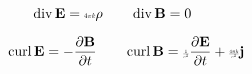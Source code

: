 \documentclass[extrafontsizes,25pt]{memoir}
\begin{document}
\newcommand{\micro}[1]{\scalebox{0.5}{$#1$}}

$$ \operatorname{div} \textbf{E} = \micro{4\pi k} \rho %
\qquad %
\operatorname{div} \textbf{B} = 0  $$



$$ \qquad \operatorname{curl} \textbf{E} = -\frac{\partial\textbf{B}}{\partial t} %
\qquad %
\operatorname{curl} \textbf{B} = \micro{\frac{1}{c^2}}\frac{\partial\textbf{E}}{\partial t} + \micro{\frac{4\pi k}{c^2}}\textbf{j} $$
\end{document}
